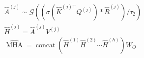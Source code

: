 ﻿\documentclass{article}
\begin{document}
\begin{preview}
\(\displaystyle
\begin{gathered}
  \hat{A}^{(j)}
  \sim \mathcal{G}\left((\sigma(\hat{K}^{(j)\top}Q^{(j)}) * \hat{R}^{(j)})/\tau_2\right) \\
  \hat{H}^{(j)}
  = \hat{A}^{(j)}V^{(j)} \\
  \widehat{\operatorname{MHA}}
  = \operatorname{concat}\left(\hat{H}^{(1)}\hat{H}^{(2)}\cdots\hat{H}^{(h)}\right)W_O 
\end{gathered}
\)
\end{preview}
\end{document}
